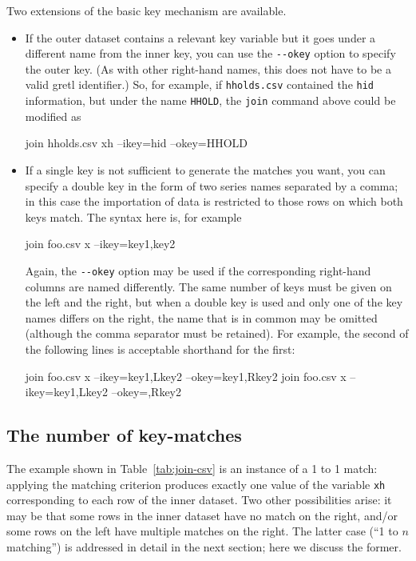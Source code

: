 Two extensions of the basic key mechanism are available.
\begin{itemize}
\item If the outer dataset contains a relevant key variable but it
  goes under a different name from the inner key, you can use the
  \verb|--okey| option to specify the outer key. (As with other
  right-hand names, this does not have to be a valid gretl
  identifier.) So, for example, if \texttt{hholds.csv} contained the
  \texttt{hid} information, but under the name \texttt{HHOLD}, the
  \texttt{join} command above could be modified as
  \begin{code}
  join hholds.csv xh --ikey=hid --okey=HHOLD
  \end{code}

\item If a single key is not sufficient to generate the matches you
  want, you can specify a double key in the form of two series names
  separated by a comma; in this case the importation of data is
  restricted to those rows on which both keys match. The syntax here
  is, for example
  \begin{code}
  join foo.csv x --ikey=key1,key2
  \end{code}
  Again, the \verb|--okey| option may be used if the corresponding
  right-hand columns are named differently. The same number of keys 
  must be given on the left and the right, but when a double key is
  used and only one of the key names differs on the right, the name
  that is in common may be omitted (although the comma separator must
  be retained). For example, the second of the following lines is
  acceptable shorthand for the first:
  \begin{code}
  join foo.csv x --ikey=key1,Lkey2 --okey=key1,Rkey2
  join foo.csv x --ikey=key1,Lkey2 --okey=,Rkey2
  \end{code}
\end{itemize}

\subsection{The number of key-matches}

The example shown in Table~\ref{tab:join-csv} is an instance of a 1 to
1 match: applying the matching criterion produces exactly one value of
the variable \texttt{xh} corresponding to each row of the inner
dataset. Two other possibilities arise: it may be that some rows in
the inner dataset have no match on the right, and/or some rows on the
left have multiple matches on the right. The latter case (``1 to $n$
matching'') is addressed in detail in the next section; here we
discuss the former.

